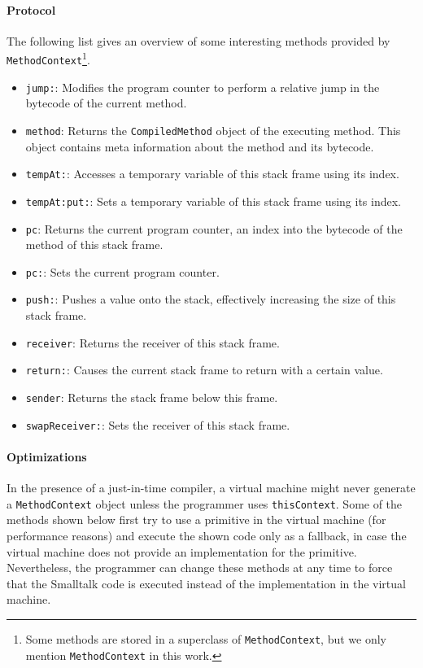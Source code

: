 \documentclass[12pt]{article}
\begin{document}
\paragraph{Protocol}
The following list gives an overview of some interesting methods provided by \texttt{MethodContext}\footnote{Some methods are stored in a superclass of \texttt{MethodContext}, but we only mention \texttt{MethodContext} in this work.}.
\begin{itemize}
    \item \texttt{jump:}: Modifies the program counter to perform a relative jump in the bytecode of the current method.
    \item \texttt{method}: Returns the \texttt{CompiledMethod} object of the executing method. This object contains meta information about the method and its bytecode.
    \item \texttt{tempAt:}: Accesses a temporary variable of this stack frame using its index.
    \item \texttt{tempAt:put:}: Sets a temporary variable of this stack frame using its index.
    \item \texttt{pc}: Returns the current program counter, an index into the bytecode of the method of this stack frame.
    \item \texttt{pc:}: Sets the current program counter.
    \item \texttt{push:}: Pushes a value onto the stack, effectively increasing the size of this stack frame.
    \item \texttt{receiver}: Returns the receiver of this stack frame.
    \item \texttt{return:}: Causes the current stack frame to return with a certain value.
    \item \texttt{sender}: Returns the stack frame below this frame.
    \item \texttt{swapReceiver:}: Sets the receiver of this stack frame.
\end{itemize}

\paragraph{Optimizations}
In the presence of a just-in-time compiler, a virtual machine might never generate a \texttt{MethodContext} object unless the programmer uses \texttt{thisContext}. Some of the methods shown below first try to use a primitive in the virtual machine (for performance reasons) and execute the shown code only as a fallback, in case the virtual machine does not provide an implementation for the primitive. Nevertheless, the programmer can change these methods at any time to force that the Smalltalk code is executed instead of the implementation in the virtual machine.
\end{document}
